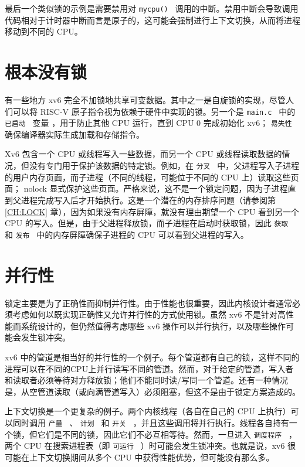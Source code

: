 \documentclass[UTF8]{article}
\begin{document}
最后一个类似锁的示例是需要禁用对  {    \tt    mycpu()   }         调用的中断。禁用中断会导致调用代码相对于计时器中断而言是原子的，这可能会强制进行上下文切换，从而将进程移动到不同的 CPU。  

   \section{根本没有锁  }     

有一些地方 xv6 完全不加锁地共享可变数据。其中之一是自旋锁的实现，尽管人们可以将 RISC-V 原子指令视为依赖于硬件中实现的锁。另一个是 {    \tt    main.c   } 中的 {    \tt    已启动   } 变量
        ，用于防止其他 CPU 运行，直到 CPU 0 完成初始化 xv6； {    \tt    易失性   }  确保编译器实际生成加载和存储指令。  

Xv6 包含一个 CPU 或线程写入一些数据，而另一个 CPU 或线程读取数据的情况，但没有专门用于保护该数据的特定锁。例如，在  {    \tt    分叉   }  中，父进程写入子进程的用户内存页面，而子进程（不同的线程，可能位于不同的 CPU 上）读取这些页面； nolock 显式保护这些页面。严格来说，这不是一个锁定问题，因为子进程直到父进程完成写入后才开始执行。这是一个潜在的内存排序问题（请参阅第    \ref{CH:LOCK}    章），因为如果没有内存屏障，就没有理由期望一个 CPU 看到另一个 CPU 的写入。但是，由于父进程释放锁，而子进程在启动时获取锁，因此  {    \tt    获取   }  和  {    \tt    发布   }  中的内存屏障确保子进程的 CPU 可以看到父进程的写入。  

   \section{并行性  }     

锁定主要是为了正确性而抑制并行性。由于性能也很重要，因此内核设计者通常必须考虑如何以既实现正确性又允许并行性的方式使用锁。虽然 xv6 不是针对高性能而系统设计的，但仍然值得考虑哪些 xv6 操作可以并行执行，以及哪些操作可能会发生锁冲突。  

xv6 中的管道是相当好的并行性的一个例子。每个管道都有自己的锁，这样不同的进程可以在不同的CPU上并行读写不同的管道。然而，对于给定的管道，写入者和读取者必须等待对方释放锁；他们不能同时读/写同一个管道。还有一种情况是，从空管道读取（或向满管道写入）必须阻塞，但这不是由于锁定方案造成的。  

上下文切换是一个更复杂的例子。两个内核线程（各自在自己的 CPU 上执行）可以同时调用  {    \tt    产量   }  、  {    \tt    计划   }  和  {    \tt    开关   }  ，并且这些调用将并行执行。线程各自持有一个锁，但它们是不同的锁，因此它们不必互相等待。然而，一旦进入  {    \tt    调度程序   }  ，两个 CPU 在搜索进程表（即  {    \tt    可运行   }  ）时可能会发生锁冲突。也就是说，xv6 很可能在上下文切换期间从多个 CPU 中获得性能优势，但可能没有那么多。  
\end{document}
